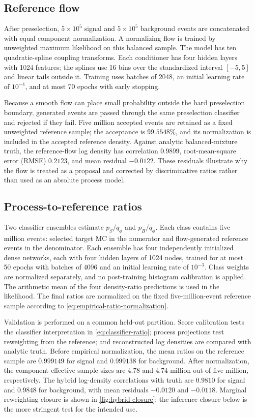 \documentclass[
  aps,
  prd,
  superscriptaddress,
  nofootinbib,
  longbibliography,
  12pt
]{revtex4-2}
\newcommand{\qRef}{q_{\phi}}
\begin{document}
\subsection{Reference flow}

After preselection, $5\times10^5$ signal and $5\times10^5$ background events are concatenated with equal component normalization.  A normalizing flow is trained by unweighted maximum likelihood on this balanced sample.  The model has ten quadratic-spline coupling transforms.  Each conditioner has four hidden layers with 1024 features; the splines use 16 bins over the standardized interval $[-5,5]$ and linear tails outside it.  Training uses batches of 2048, an initial learning rate of $10^{-4}$, and at most 70 epochs with early stopping.

Because a smooth flow can place small probability outside the hard preselection boundary, generated events are passed through the same preselection classifier and rejected if they fail.  Five million accepted events are retained as a fixed unweighted reference sample; the acceptance is $99.5548\%$, and its normalization is included in the accepted reference density.  Against analytic balanced-mixture truth, the reference-flow log density has correlation $0.9899$, root-mean-square error (RMSE) $0.2123$, and mean residual $-0.0122$.  These residuals illustrate why the flow is treated as a proposal and corrected by discriminative ratios rather than used as an absolute process model.

\subsection{Process-to-reference ratios}

Two classifier ensembles estimate $p_S/\qRef$ and $p_B/\qRef$.  Each class contains five million events: selected target MC in the numerator and flow-generated reference events in the denominator.  Each ensemble has four independently initialized dense networks, each with four hidden layers of 1024 nodes, trained for at most 50 epochs with batches of 4096 and an initial learning rate of $10^{-3}$.  Class weights are normalized separately, and no post-training histogram calibration is applied.  The arithmetic mean of the four density-ratio predictions is used in the likelihood.  The final ratios are normalized on the fixed five-million-event reference sample according to \cref{eq:empirical-ratio-normalization}.

Validation is performed on a common held-out partition.  Score calibration tests the classifier interpretation in \cref{eq:classifier-ratio}; process projections test reweighting from the reference; and reconstructed log densities are compared with analytic truth.  Before empirical normalization, the mean ratios on the reference sample are $0.999149$ for signal and $0.999138$ for background.  After normalization, the component effective sample sizes are $4.78$ and $4.74$ million out of five million, respectively.  The hybrid log-density correlations with truth are $0.9810$ for signal and $0.9848$ for background, with mean residuals $-0.0120$ and $-0.0118$.  Marginal reweighting closure is shown in \cref{fig:hybrid-closure}; the inference closure below is the more stringent test for the intended use.
\end{document}
